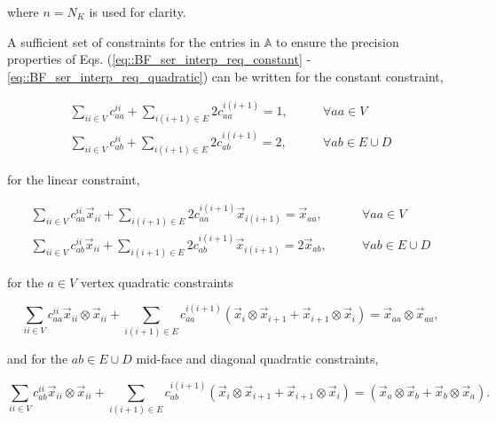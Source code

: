 \noindent where $n=N_K$ is used for clarity.

A sufficient set of constraints for the entries in $\mathbb{A}$ to ensure the precision properties of Eqs. (\ref{eq::BF_ser_interp_req_constant} - \ref{eq::BF_ser_interp_req_quadratic}) can be written for the constant constraint,

\begin{equation}
\label{eq::BF_Amat_cons_constraints}
\begin{aligned}
\sum_{ii \in V} c_{aa}^{ii} + \sum_{i(i+1) \in E} 2 c_{aa}^{i(i+1)} = 1, &\qquad \forall aa \in V \\
\sum_{ii \in V} c_{ab}^{ii} + \sum_{i(i+1) \in E} 2 c_{ab}^{i(i+1)} = 2, &\qquad \forall ab \in E \cup D
\end{aligned}
\end{equation}

\noindent for the linear constraint,

\begin{equation}
\label{eq::BF_Amat_lin_constraints}
\begin{aligned}
\sum_{ii \in V} c_{aa}^{ii} \vec{x}_{ii} + \sum_{i(i+1) \in E} 2 c_{aa}^{i(i+1)} \vec{x}_{i(i+1)} = \vec{x}_{aa}, &\qquad \forall aa \in V \\
\sum_{ii \in V} c_{ab}^{ii} \vec{x}_{ii} + \sum_{i(i+1) \in E} 2 c_{ab}^{i(i+1)} \vec{x}_{i(i+1)} = 2 \vec{x}_{ab}, &\qquad \forall ab \in E \cup D
\end{aligned}
\end{equation}

\noindent for the $a\in V$ vertex quadratic constraints

\begin{equation}
\label{eq::BF_Amat_quad_vert_constraints}
\sum_{ii \in V} c_{aa}^{ii} \vec{x}_{ii} \otimes \vec{x}_{ii} + \sum_{i(i+1) \in E}  c_{aa}^{i(i+1)} \left( \vec{x}_i \otimes \vec{x}_{i+1} + \vec{x}_{i+1} \otimes \vec{x}_i \right) = \vec{x}_{aa} \otimes \vec{x}_{aa}, 
\end{equation}

\noindent and for the $ab \in E \cup D$ mid-face and diagonal quadratic constraints,

\begin{equation}
\label{eq::BF_Amat_quad_facediag_constraints}
\sum_{ii \in V} c_{ab}^{ii} \vec{x}_{ii} \otimes \vec{x}_{ii} + \sum_{i(i+1) \in E}  c_{ab}^{i(i+1)} \left( \vec{x}_i \otimes \vec{x}_{i+1} + \vec{x}_{i+1} \otimes \vec{x}_i \right) = \left( \vec{x}_a \otimes \vec{x}_{b} + \vec{x}_{b} \otimes \vec{x}_a \right).
\end{equation}

